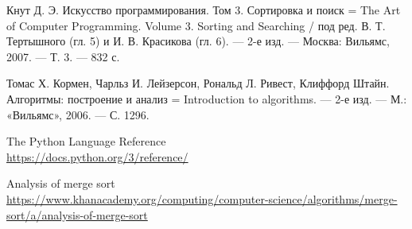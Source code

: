 


\begin{thebibliography}{8}

    Кнут Д. Э. Искусство программирования. Том 3. Сортировка и поиск = The Art of Computer Programming. Volume 3. Sorting and Searching
    / под ред. В. Т. Тертышного (гл. 5) и И. В. Красикова (гл. 6). — 2-е изд. — Москва: Вильямс, 2007. — Т. 3. — 832 с.

    Томас Х. Кормен, Чарльз И. Лейзерсон, Рональд Л. Ривест, Клиффорд Штайн.
    Алгоритмы: построение и анализ = Introduction to algorithms.
    — 2-е изд. — М.: «Вильямс», 2006. — С. 1296.

    The Python Language Reference
    \\\url{https://docs.python.org/3/reference/}

    Analysis of merge sort
    \\\url{https://www.khanacademy.org/computing/computer-science/algorithms/merge-sort/a/analysis-of-merge-sort}

\end{thebibliography}